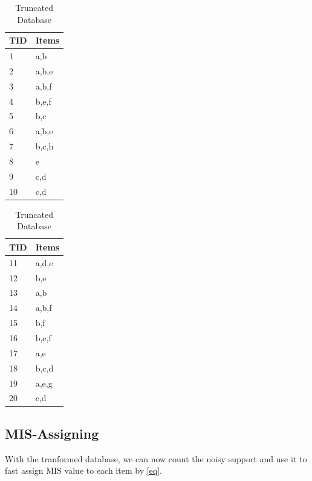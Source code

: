 \documentclass[conference]{IEEEtran}
\begin{document}
\begin{table}[tb]
    \caption{Truncated Database}
    \centering    
    \begin{tabular}{|l|l|}
    \hline
    TID & \multicolumn{1}{c|}{Items} \\ \hline
    1   & a,b   \\ \hline
    2   & a,b,e \\ \hline
    3   & a,b,f \\ \hline
    4   & b,e,f \\ \hline
    5   & b,c   \\ \hline
    6   & a,b,e \\ \hline
    7   & b,c,h \\ \hline
    8   & e     \\ \hline
    9   & c,d   \\ \hline
    10  & c,d   \\ \hline
    \end{tabular}
    \begin{tabular}{|l|l|}
    \hline
    TID & \multicolumn{1}{c|}{Items} \\ \hline
    11  & a,d,e          \\ \hline
    12  & b,e        \\ \hline
    13  & a,b         \\ \hline
    14  & a,b,f        \\ \hline
    15  & b,f      \\ \hline
    16  & b,e,f  \\ \hline
    17  & a,e        \\ \hline
    18  & b,c,d          \\ \hline
    19  & a,e,g         \\ \hline
    20  & c,d        \\ \hline
    \end{tabular}
    \label{db2}
\end{table}




\subsection{MIS-Assigning}
With the tranformed database, we can now count the noisy support and use it to fast assign MIS value to each item by \eqref{eq}.
\end{document}
